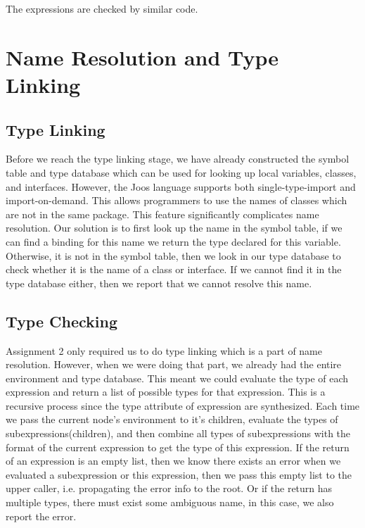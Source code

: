 \documentclass[12pt,letterpaper]{article}
\begin{document}
The expressions are checked by similar code.

\section{Name Resolution and Type Linking}
\subsection{Type Linking}

Before we reach the type linking stage, we have already constructed the symbol table and type database which can be used for looking up local variables, classes, and interfaces.
However, the Joos language supports both single-type-import and import-on-demand.
This allows programmers to use the names of classes which are not in the same package.
This feature significantly complicates name resolution.
Our solution is to first look up the name in the symbol table, if we can find a binding for this name we return the type declared for this variable.
Otherwise, it is not in the symbol table, then we look in our type database to check whether it is the name of a class or interface.
If we cannot find it in the type database either, then we report that we cannot resolve this name.


\subsection{Type Checking}

Assignment 2 only required us to do type linking which is a part of name resolution.
However, when we were doing that part, we already had the entire environment and type database.
This meant we could evaluate the type of each expression and return a list of possible types for that expression.
This is a recursive process since the type attribute of expression are synthesized.
Each time we pass the current node's environment to it's children, evaluate the types of subexpressions(children), and then combine all types of subexpressions with the format of the current expression to get the type of this expression.
If the return of an expression is an empty list, then we know there exists an error when we evaluated a subexpression or this expression, then we pass this empty list to the upper caller, i.e. propagating the error info to the root.
Or if the return has multiple types, there must exist some ambiguous name, in this case, we also report the error.
\end{document}
